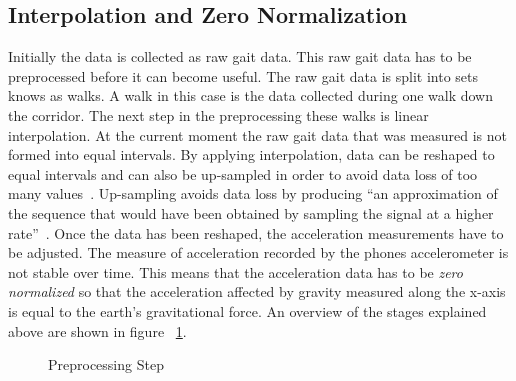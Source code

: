 \documentclass{sig-alternate}
\begin{document}
\subsection{Interpolation and Zero Normalization }	
	Initially the data is collected as raw gait data. This raw gait data has to be preprocessed before it can become useful. The raw gait data is split into sets knows as walks. A walk in this case is the data collected during one walk down the corridor. The next step in the preprocessing these walks is linear interpolation. At the current moment the raw gait data that was measured is not formed into equal intervals. By applying interpolation, data can be reshaped to equal intervals and can also be up-sampled in order to avoid data loss of too many values~\cite{Muaaz:2013}. Up-sampling avoids data loss by producing ``an approximation of the sequence that would have been obtained by sampling the signal at a higher rate''~\cite{wiki1:2014}. Once the data has been reshaped, the acceleration measurements have to be adjusted. The measure of acceleration recorded by the phones accelerometer is not stable over time. This means that the acceleration data has to be \textit{zero normalized} so that the acceleration affected by gravity measured along the x-axis is equal to the earth's gravitational force. An overview of the stages explained above are shown in figure ~\ref{fig:firstStep}.

\begin{figure}
\centering
{}
\caption{Preprocessing Step}
\label{fig:firstStep}
\end{figure}
\end{document}
